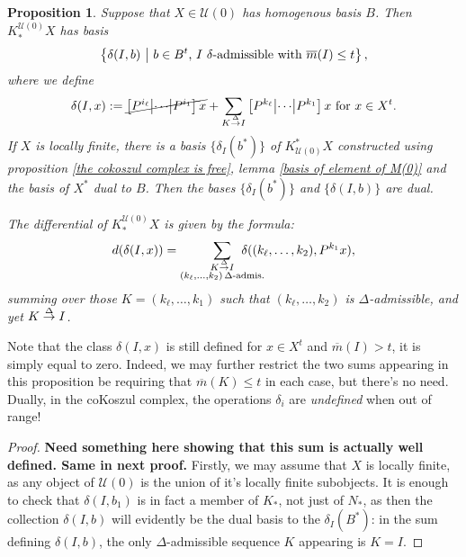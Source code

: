 \documentclass[11pt]{amsart}
\theoremstyle{plain}
\newtheorem{prop}[thm]{Proposition}
\theoremstyle{definition}
\newcommand{\calU}{\mathcal{U}}
\theoremstyle{plain}
\newcommand{\deltaalg}{\Delta} %
\newcommand{\minDimP}{\overline{m}}
\newcommand{\produces}[3]{#3:#1\sim #2}
\renewcommand{\produces}[3]{#1\rightarrow_{#3} #2}%
\renewcommand{\produces}[3]{#1\overset{\smash{#3}}{\rightarrow} #2}%
\begin{document}
\begin{Koszul complexes}
\begin{prop}\label{propDerivedIndTrivialUobject n=0}
Suppose that $X\in\calU(0)$ has homogenous basis $B$. Then $K_*^{\calU(0)}X$ has basis
\[\left\{\delta(I,b)\ \middle|\ b\in B^t\textup{, $I$ $\delta$-admissible with }\minDimP(I)\leq t\right\},\]
where we define
\[\delta(I,x):=\cancel{\left[P^{i_\ell}\middle|\cdots\middle|P^{i_1} \right]x}+\sum_{\produces{K}{I}{\deltaalg}}\left[P^{k_\ell} \middle|\cdots\middle|P^{k_1} \right]x\textup{ for $x\in X^t$}.\]
%
If $X$ is locally finite, there is a basis $\{\delta_I(b^*)\}$ of $K^*_{\calU(0)}X$ constructed using proposition \ref{the cokoszul complex is free}, lemma \ref{basis of element of M(0)} and the basis of $X^*$ dual to $B$. Then the bases $\{\delta_I(b^*)\}$ and $\{\delta(I,b)\}$ are dual.

The differential of $K^{\calU(0)}_*X$ is given by the formula:
\[d(\delta(I,x))=\sum_{ \substack{\produces{K}{I}{\deltaalg}\\(k_{\ell},\ldots,k_2){\,\deltaalg\textup{-admis.}}}}\!\!\!\!\!\!\!\!\!\!\!\! \delta((k_{\ell},\ldots,k_2),P^{k_1}x),\]
summing over those $K=(k_{\ell},\ldots,k_1)$ such that $(k_{\ell},\ldots,k_2)$ is $\deltaalg$-admissible, and yet $\produces{K}{I}{\deltaalg}$.
\end{prop}
Note that the class $\delta(I,x)$ is still defined for $x\in X^t$ and $\minDimP(I)>t$, it is simply equal to zero. Indeed, we may further restrict the two sums appearing in this proposition be requiring that $\minDimP(K)\leq t$ in each case, but there's no need. Dually, in the coKoszul complex, the operations $\delta_i$ are \emph{undefined} when out of range!
\begin{proof}\textbf{Need something here showing that this sum is actually well defined. Same in next proof.}
Firstly, we may assume that $X$ is locally finite, as any object of $\calU(0)$ is the union of it's locally finite subobjects. It is enough to check that $\delta(I,b_1)$ is in fact a member of $K_*$, not just of $N_*$, as then the collection $\delta(I,b)$ will evidently be the dual basis to the $\delta_I(B^*)$: in the sum defining $\delta(I,b)$, the only $\deltaalg$-admissible sequence $K$ appearing is $K=I$. %


\end{proof}
\end{Koszul complexes}
\end{document}
